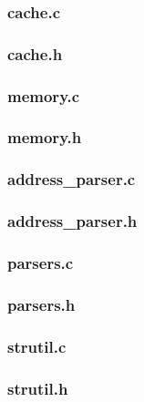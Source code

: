 \documentclass[titlepage,a4paper]{article}
\begin{document}
\subsubsection{cache.c}


\subsubsection{cache.h}


\subsubsection{memory.c}


\subsubsection{memory.h}


\subsubsection{address_parser.c}


\subsubsection{address_parser.h}


\subsubsection{parsers.c}


\subsubsection{parsers.h}


\subsubsection{strutil.c}


\subsubsection{strutil.h}

\end{document}
